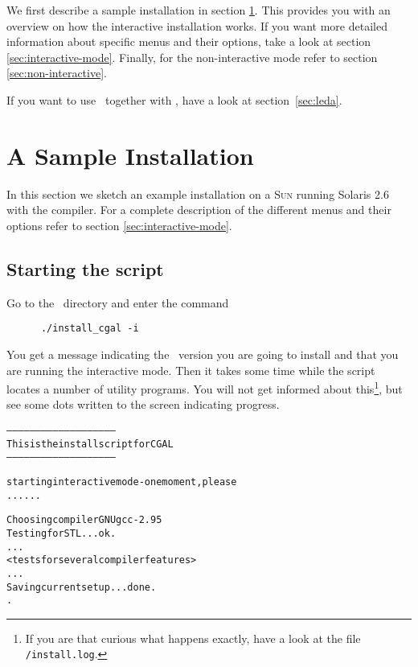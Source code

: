 We first describe a sample installation in section
\ref{sec:sample-inst}. This provides you with an overview on how the
interactive installation works. If you want more detailed information
about specific menus and their options, take a look at section
\ref{sec:interactive-mode}. Finally, for the non-interactive mode
refer to section \ref{sec:non-interactive}.

If you want to use \leda\ together with \cgal, have a look at
section~\ref{sec:leda}.

\section{A Sample Installation}\label{sec:sample-inst}

In this section we sketch an example installation on a \textsc{Sun}
running Solaris 2.6 with the  compiler. For a complete
description of the different menus and their options refer to section
\ref{sec:interactive-mode}.

\subsection{Starting the script}

Go to the \cgaldir\ directory and enter the command
\begin{verbatim}
      ./install_cgal -i
\end{verbatim}

You get a message indicating the \cgal\ version you are going to
install and that you are running the interactive mode. Then it takes
some time while the script locates a number of utility programs. You
will not get informed about this\footnote{If you are that curious what
  happens exactly, have a look at the file
  \texttt{\cgaldir/install.log}.}, but see some dots written to the
screen indicating progress.

{\ccTexHtml{\scriptsize}{}
\begin{alltt}
--------------------------------------------------------
  This is the install script for CGAL \cgalrelease
--------------------------------------------------------

starting interactive mode - one moment, please
......

  Choosing compiler GNU gcc-2.95
  Testing for STL ... ok.
  ...
  <tests for several compiler features>
  ...
  Saving current setup ... done.
.
\end{alltt}}
  

